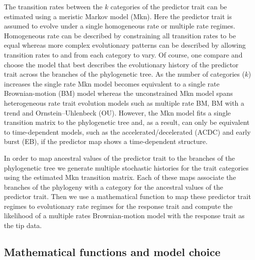 The transition rates between the $\mathit{k}$ categories of the predictor trait can be estimated using a meristic Markov model (Mkn). Here the predictor trait is assumed to evolve under a single homogeneous rate or multiple rate regimes. Homogeneous rate can be described by constraining all transition rates to be equal whereas more complex evolutionary patterns can be described by allowing transition rates to and from each category to vary. Of course, one compare and choose the model that best describes the evolutionary history of the predictor trait across the branches of the phylogenetic tree. As the number of categories ($\mathit{k}$) increases the single rate Mkn model becomes equivalent to a single rate Brownian-motion (BM) model whereas the unconstrained Mkn model spans heterogeneous rate trait evolution models such as multiple rate BM, BM with a trend and Ornstein–Uhlenbeck (OU). However, the Mkn model fits a single transition matrix to the phylogenetic tree and, as a result, can only be equivalent to time-dependent models, such as the accelerated/decelerated (ACDC) and early burst (EB), if the predictor map shows a time-dependent structure.

In order to map ancestral values of the predictor trait to the branches of the phylogenetic tree we generate multiple stochastic histories for the trait categories using the estimated Mkn transition matrix. Each of these maps associate the branches of the phylogeny with a category for the ancestral values of the predictor trait. Then we use a mathematical function to map these predictor trait regimes to evolutionary rate regimes for the response trait and compute the likelihood of a multiple rates Brownian-motion model with the response trait as the tip data.

\subsection{Mathematical functions and model choice}

